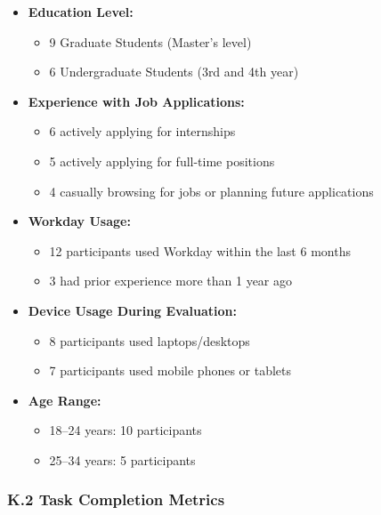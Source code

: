 \documentclass[
	letterpaper, %
]{jdf}
\begin{document}
\begin{sloppypar}
\begin{itemize}
    \item \textbf{Education Level:} 
    \begin{itemize}
        \item 9 Graduate Students (Master’s level)
        \item 6 Undergraduate Students (3rd and 4th year)
    \end{itemize}

    \item \textbf{Experience with Job Applications:}
    \begin{itemize}
        \item 6 actively applying for internships
        \item 5 actively applying for full-time positions
        \item 4 casually browsing for jobs or planning future applications
    \end{itemize}

    \item \textbf{Workday Usage:}
    \begin{itemize}
        \item 12 participants used Workday within the last 6 months
        \item 3 had prior experience more than 1 year ago
    \end{itemize}

    \item \textbf{Device Usage During Evaluation:}
    \begin{itemize}
        \item 8 participants used laptops/desktops
        \item 7 participants used mobile phones or tablets
    \end{itemize}

    \item \textbf{Age Range:}
    \begin{itemize}
        \item 18–24 years: 10 participants
        \item 25–34 years: 5 participants
    \end{itemize}
\end{itemize}

\subsubsection{K.2 Task Completion Metrics}


\end{sloppypar}
\end{document}
